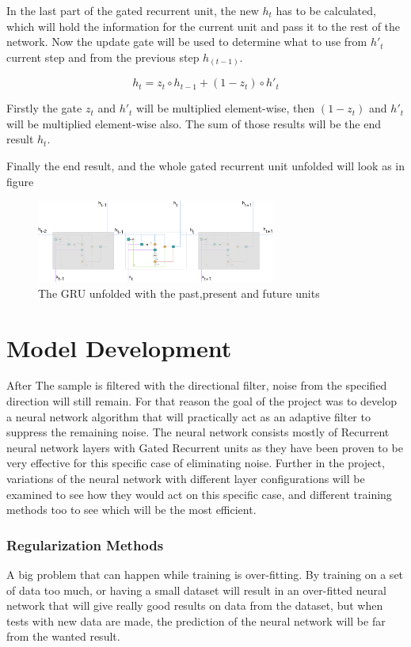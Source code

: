 In the last part of the gated recurrent unit, the new $h_t$ has to be calculated, which will hold the information for the current unit and pass it to the rest of the network.
Now the update gate will be used to determine what to use from $h'_t$ current step and from the previous step $h_{(t-1)}$.

\begin{equation}
h_t=z_t \circ h_{t-1}+(1-z_t) \circ h'_t
\end{equation}

Firstly the gate $z_t$ and $h'_t$ will be multiplied element-wise, then $(1-z_t)$ and $h'_t$ will be multiplied element-wise also. The sum of those results will be the end result $h_t$. 

Finally the end result, and the whole gated recurrent unit unfolded will look as in figure 

\begin{figure}[htp]
	\centering
	\includegraphics[width=0.7\textwidth]{Illustrations/GRUunfolded.png}
	\caption{The GRU unfolded with the past,present and future units}
	\label{fig:GRUunfolded}
\end{figure}

\section{Model Development}

After The sample is filtered with the directional filter, noise from the specified direction will still remain. For that reason the goal of the project was to develop a neural network algorithm that will practically act as an adaptive filter to suppress the remaining noise. The neural network consists mostly of Recurrent neural network layers with Gated Recurrent units as they have been proven to be very effective for this specific case of eliminating noise. Further in the project, variations of the neural network with different layer configurations will be examined to see how they would act on this specific case, and different training methods too to see which will be the most efficient.

\subsubsection{Regularization Methods}
A big problem that can happen while training is over-fitting. By training on a set of data too much, or having a small dataset will result in an over-fitted neural network that will give really good results on data from the dataset, but when tests with new data are made, the prediction of the neural network will be far from the wanted result.


